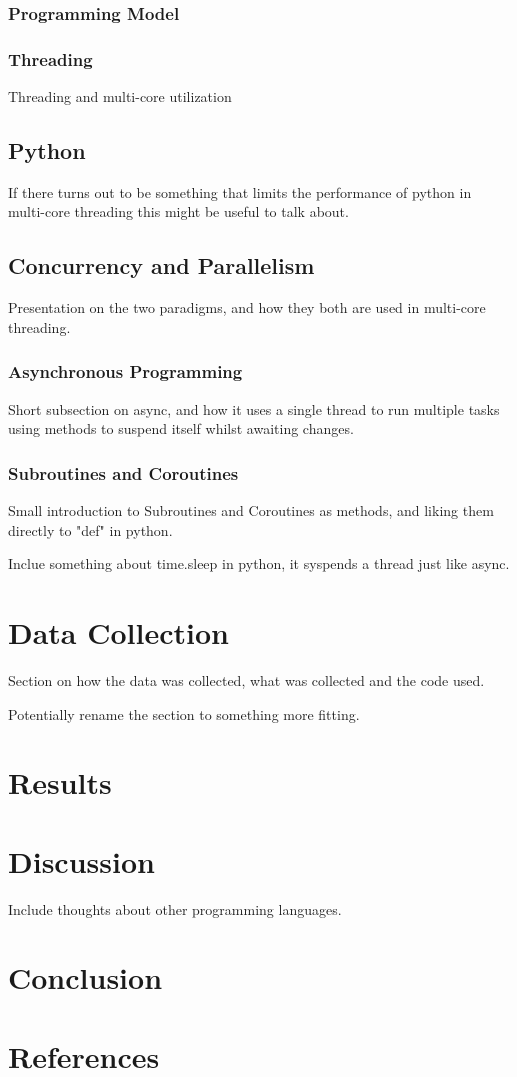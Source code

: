 \documentclass{article}
\begin{document}
\subsubsection{Programming Model}

\subsubsection{Threading}

Threading and multi-core utilization 

\subsection{Python}

If there turns out to be something that limits the performance of python in multi-core threading this might be useful to talk about.

\subsection{Concurrency and Parallelism}

Presentation on the two paradigms, and how they both are used in multi-core threading.

\subsubsection{Asynchronous Programming}

Short subsection on async, and how it uses a single thread to run multiple tasks using methods to suspend itself whilst awaiting changes.

\subsubsection{Subroutines and Coroutines}

Small introduction to Subroutines and Coroutines as methods, and liking them directly to "def" in python.

Inclue something about time.sleep in python, it syspends a thread just like async.

\section{Data Collection}

Section on how the data was collected, what was collected and the code used. 

Potentially rename the section to something more fitting.

\section{Results}

\section{Discussion}

Include thoughts about other programming languages.

\section{Conclusion}
\newpage
\section{References}
\printbibliography
\end{document}
